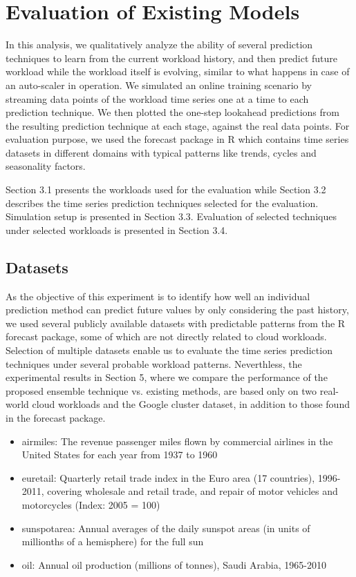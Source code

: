 \section{Evaluation of Existing Models}

In this analysis, we qualitatively analyze the ability of several prediction techniques to learn from the current workload history, and then predict future workload while the workload itself is evolving, similar to what happens in case of an auto-scaler in operation. We simulated an online training scenario by streaming data points of the workload time series one at a time to each prediction technique. We then plotted the one-step lookahead predictions from the resulting prediction technique at each stage, against the real data points. For evaluation purpose, we used the forecast package in R \cite{forecastPackage} which contains time series datasets in different domains with typical patterns like trends, cycles and seasonality factors.

Section 3.1 presents the workloads used for the evaluation while Section 3.2 describes the time series prediction techniques selected for the evaluation. Simulation setup is presented in Section 3.3. Evaluation of selected techniques under selected workloads is presented in Section 3.4.

\subsection{Datasets}
As the objective of this experiment is to identify how well an individual prediction method can predict future values by only considering the past history, we used several publicly available datasets with predictable patterns from the R forecast package, some of which are not directly related to cloud workloads. Selection of multiple datasets enable us to evaluate the time series prediction techniques under several probable workload patterns. Neverthless, the experimental results in Section 5, where we compare the performance of the proposed ensemble technique vs. existing methods, are based only on two real-world cloud workloads and the Google cluster dataset, in addition to those found in the forecast package.

\begin{itemize}
\item airmiles: The revenue passenger miles flown by commercial airlines in the United States for each year from 1937 to 1960
\item euretail: Quarterly retail trade index in the Euro area (17 countries), 1996-2011, covering wholesale and retail trade, and repair of motor vehicles and motorcycles (Index: 2005 = 100)
\item sunspotarea: Annual averages of the daily sunspot areas (in units of millionths of a hemisphere) for the full sun
\item oil: Annual oil production (millions of tonnes), Saudi Arabia, 1965-2010
\end{itemize}


